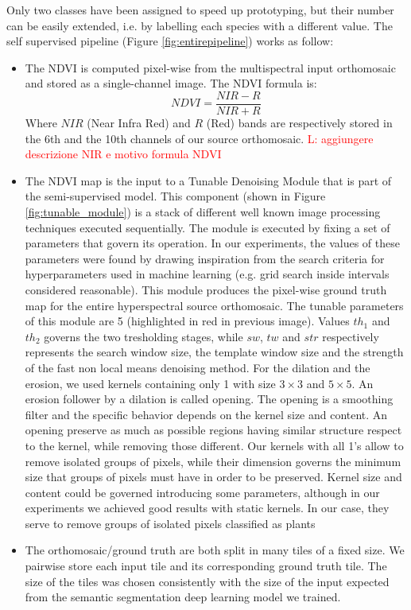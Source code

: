 \documentclass[comsoc,final]{IEEEtran}
\newcommand{\todo}[1]{\textcolor{red}{#1}}
\begin{document}
Only two classes have been assigned to speed up prototyping, but their number can be easily extended, i.e. by labelling each species with a different value. The self supervised pipeline (Figure \ref{fig:entirepipeline}) works as follow:

\begin{itemize}
    \item The NDVI is computed pixel-wise from the multispectral input orthomosaic and stored as a single-channel image. The NDVI formula is:
    \[
    NDVI = \frac{NIR-R}{NIR+R}
    \]
    Where $NIR$ (Near Infra Red) and $R$ (Red) bands are respectively stored in the 6th and the 10th channels of our source orthomosaic.
    \todo{L: aggiungere descrizione NIR e motivo formula NDVI}
    \item The NDVI map is the input to a Tunable Denoising Module that is part of the semi-supervised model. This component (shown in Figure \ref{fig:tunable_module}) is a stack of different well known image processing techniques executed sequentially. 
    The module is executed by fixing a set of parameters that govern its operation. In our experiments, the values of these parameters were found by drawing inspiration from the search criteria for hyperparameters used in machine learning (e.g. grid search inside intervals considered reasonable).
    This module produces the pixel-wise ground truth map for the entire hyperspectral source orthomosaic. The tunable parameters of this module are 5 (highlighted in red in previous image). Values $th_1$ and $th_2$ governs the two tresholding stages, while $sw$, $tw$ and $str$ respectively represents the search window size, the template window size and the strength of the fast non local means denoising method. For the dilation and the erosion, we used kernels containing only 1 with size $3\times3$ and $5\times5$.
    An erosion follower by a dilation is called opening. The opening is a smoothing filter and the specific behavior depends on the kernel size and content. An opening preserve as much as possible regions having similar structure respect to the kernel, while removing those different. Our kernels with all 1's allow to remove isolated groups of pixels, while their dimension governs the minimum size that groups of pixels must have in order to be preserved. Kernel size and content could be governed introducing some parameters, although in our experiments we achieved good results with static kernels.
In our case, they serve to remove groups of isolated pixels classified as plants 
    \item The orthomosaic/ground truth are both split in many tiles of a fixed size. We pairwise store each input tile and its corresponding ground truth tile. The size of the tiles was chosen consistently with the size of the input expected from the semantic segmentation deep learning model we trained.
\end{itemize}
\end{document}
